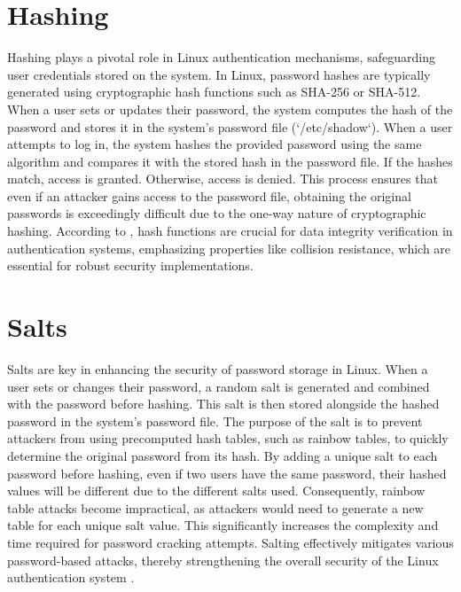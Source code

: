 \documentclass[
]{article}
\begin{document}
\begin{multicols}{2}
\section{Hashing}
Hashing plays a pivotal role in Linux authentication mechanisms, safeguarding user credentials stored on the system. In Linux, password hashes are typically generated using cryptographic hash functions such as SHA-256 or SHA-512. When a user sets or updates their password, the system computes the hash of the password and stores it in the system's password file (`/etc/shadow`). When a user attempts to log in, the system hashes the provided password using the same algorithm and compares it with the stored hash in the password file. If the hashes match, access is granted. Otherwise, access is denied. This process ensures that even if an attacker gains access to the password file, obtaining the original passwords is exceedingly difficult due to the one-way nature of cryptographic hashing. According to \cite{doe2020survey}, hash functions are crucial for data integrity verification in authentication systems, emphasizing properties like collision resistance, which are essential for robust security implementations.

\section{Salts}
Salts are key in enhancing the security of password storage in Linux. When a user sets or changes their password, a random salt is generated and combined with the password before hashing. This salt is then stored alongside the hashed password in the system's password file. The purpose of the salt is to prevent attackers from using precomputed hash tables, such as rainbow tables, to quickly determine the original password from its hash. By adding a unique salt to each password before hashing, even if two users have the same password, their hashed values will be different due to the different salts used. Consequently, rainbow table attacks become impractical, as attackers would need to generate a new table for each unique salt value. This significantly increases the complexity and time required for password cracking attempts. Salting effectively mitigates various password-based attacks, thereby strengthening the overall security of the Linux authentication system \cite{smith2021importance}.


\end{multicols}
\end{document}
